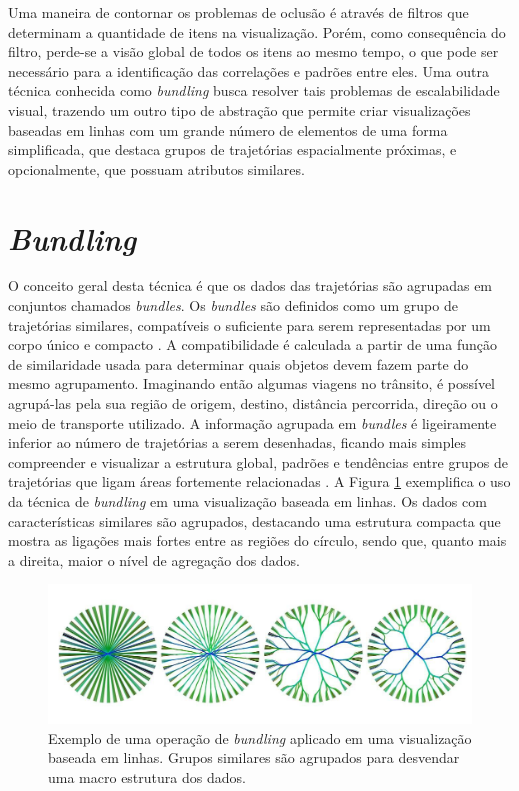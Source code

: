 Uma maneira de contornar os problemas de oclusão é através de filtros que determinam
a quantidade de itens na visualização. Porém, como consequência do filtro, perde-se a visão
global de todos os itens ao mesmo tempo, o que pode ser necessário para a identificação das
correlações e padrões entre eles. Uma outra técnica conhecida como \emph{bundling} busca resolver
tais problemas de escalabilidade visual, trazendo um outro tipo de abstração que permite
criar visualizações baseadas em linhas com um grande número de elementos de uma forma simplificada,
que destaca grupos de trajetórias espacialmente próximas, e opcionalmente, que possuam atributos similares.



\section{\emph{Bundling}}
\label{sec:bundling}

O conceito geral desta técnica é que os dados das trajetórias são agrupadas em
conjuntos chamados \emph{bundles}. Os \emph{bundles} são definidos como um grupo
de trajetórias similares, compatíveis o suficiente para serem representadas por
um corpo único e compacto \citep{Lhuillier2017}. A compatibilidade é calculada a
partir de uma função de similaridade usada para determinar quais objetos devem
fazem parte do mesmo agrupamento. Imaginando então algumas viagens no trânsito,
é possível agrupá-las pela sua região de origem, destino, distância percorrida,
direção ou o meio de transporte utilizado. A informação agrupada em
\emph{bundles} é ligeiramente inferior ao número de trajetórias a serem
desenhadas, ficando mais simples compreender e visualizar a estrutura global,
padrões e tendências entre grupos de trajetórias que ligam áreas fortemente
relacionadas \citep{Zhou2013}. A Figura \ref{fig:bundling-ex} exemplifica o uso
da técnica de \emph{bundling} em uma visualização baseada em linhas. Os dados
com características similares são agrupados, destacando uma estrutura compacta
que mostra as ligações mais fortes entre as regiões do círculo, sendo que,
quanto mais a direita, maior o nível de agregação dos dados.

\begin{figure}[!htb]
  \centering
  \includegraphics[width=1\textwidth]{../figuras/bundling.jpeg}
  \caption[Exemplo de uma operação de \emph{bundling} aplicado em uma visualização baseada em linhas]{
  Exemplo de uma operação de \emph{bundling} aplicado em uma visualização baseada em linhas. Grupos similares
  são agrupados para desvendar uma macro estrutura dos dados.}
  \label{fig:bundling-ex}
\end{figure}

